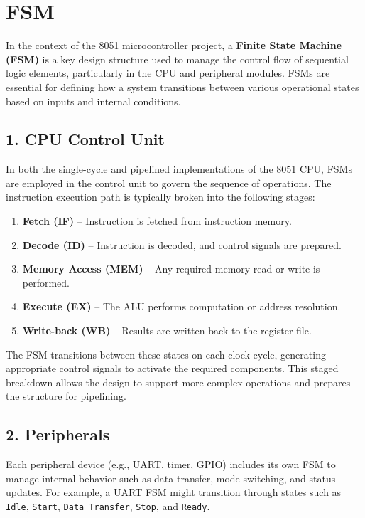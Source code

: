\section{FSM}

\vspace{0.75cm}


In the context of the 8051 microcontroller project, a \textbf{Finite State Machine (FSM)} 
is a key design structure used to manage the control flow of sequential logic elements,
particularly in the CPU and peripheral modules. FSMs are essential for defining how a 
system transitions between various operational states based on inputs and internal conditions.

\subsection*{1. CPU Control Unit}

In both the single-cycle and pipelined implementations of the 8051 CPU, FSMs are employed
in the control unit to govern the sequence of operations. The instruction execution path 
is typically broken into the following stages:

\begin{enumerate}
    \item \textbf{Fetch (IF)} – Instruction is fetched from instruction memory.
    \item \textbf{Decode (ID)} – Instruction is decoded, and control signals are prepared.
    \item \textbf{Memory Access (MEM)} – Any required memory read or write is performed.
    \item \textbf{Execute (EX)} – The ALU performs computation or address resolution.
    \item \textbf{Write-back (WB)} – Results are written back to the register file.
\end{enumerate}

The FSM transitions between these states on each clock cycle, generating appropriate control 
signals to activate the required components. This staged breakdown allows the design to 
support more complex operations and prepares the structure for pipelining.

\subsection*{2. Peripherals}

Each peripheral device (e.g., UART, timer, GPIO) includes its own FSM to manage internal
behavior such as data transfer, mode switching, and status updates. For example, a UART FSM
might transition through states such as 
\texttt{Idle}, \texttt{Start}, \texttt{Data Transfer}, \texttt{Stop}, and \texttt{Ready}.

